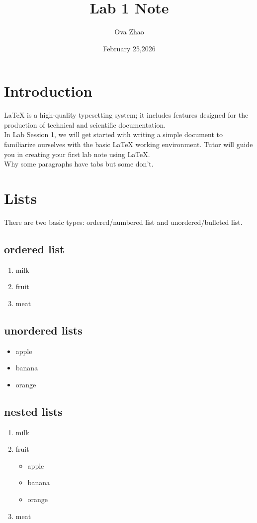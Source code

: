 \documentclass{article}
\title{Lab 1 Note}
\author{Ova Zhao}
\date{February 25,2026}
\begin{document}
	\maketitle
	\tableofcontents
	
	\newpage
	
	\section{Introduction}
	
	\LaTeX{} is a high-quality typesetting system; it includes features designed for the production of technical and scientific documentation.\\
	
	In Lab Session 1, we will get started with writing a simple document to	familiarize ourselves with the basic \LaTeX{} working environment. Tutor will guide you in creating your first lab note using \LaTeX{}.\\
	
	Why some paragraphs have tabs but some don't.
	
	\section{Lists}
	
	There are two basic types: ordered/numbered list and unordered/bulleted list.
	
	\subsection{ordered list}
	
	\begin{enumerate}
		\item milk
		\item fruit
		\item meat
	\end{enumerate}
	
	\subsection{unordered lists}
	\begin{itemize}
		\item apple
		\item[-] banana
		\item orange
	\end{itemize}
	
	\subsection{nested lists}
	\begin{enumerate}
		\item milk
		\item fruit
			\begin{itemize}
			\item apple
			\item[-] banana
			\item orange
			\end{itemize}
		\item meat
	\end{enumerate}
\end{document}
